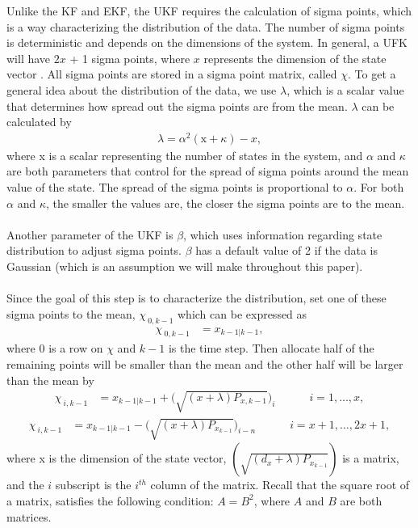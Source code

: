 \begin{enumerate}
\noindent Unlike the KF and EKF, the UKF requires the calculation of sigma points, which is a way characterizing the distribution of the data. The number of sigma points is deterministic and depends on the dimensions of the system. In general, a UFK will have  $2x$ + 1 sigma points, where $x$ represents the dimension of the state vector \cite{inbook, inproceedings, Wan01theunscented}.  All sigma points are stored in a sigma point matrix, called $\chi$. To get a general idea about the distribution of the data, we use $\lambda$, which is a scalar value that determines how spread out the sigma points are from the mean. $\lambda$ can be calculated by
         \begin{align*}
        \lambda = \alpha^{2}(\text{x}+\kappa)-x,
         \end{align*}
         where x is a scalar representing the number of states in the system, and $\alpha$ and $\kappa$ are both parameters that control for the spread of sigma points around the mean value of the state. The spread of the sigma points is proportional to $\alpha$. For both $\alpha$ and $\kappa $,  the smaller the values are, the closer the sigma points are to the mean.\\ \\
       Another parameter of the UKF is $\beta$, which uses information regarding state distribution to adjust sigma points. $\beta$ has a default value of 2 if the data is Gaussian (which is an assumption we will make throughout this paper).  \\ \\
       Since the goal of this step is to characterize the distribution, set one of these sigma points to the mean, $\chi_{\ 0,k-1}$ which can be expressed as 
    \begin{align*}
        \chi_{\ 0,k-1} &= x_{k-1|k-1} ,
     \end{align*}
     where 0 is a row on $\chi$ and $k-1$ is the time step. Then allocate half of the remaining points will be smaller than the mean and the other half will be larger than the mean by
         \begin{align*}
        \chi_{\ i,k-1} &= x_{k-1|k-1} +  \bigg(\sqrt{(x+\lambda )P_{x,{k-1}}}\bigg)_{i} \quad \quad \quad i=1,\dots, x, 
        \end{align*}
         \begin{align*}
        \chi_{\ i,k-1} &= x_{k-1|k-1} - \bigg(\sqrt{(x+\lambda )P_{x_{k-1}}}\bigg)_{i-n} \quad \quad \quad i=x + 1,\dots,2x + 1,
        \end{align*}
        where x is the dimension of the state vector, $(\sqrt{(d_{x}+\lambda)P_{x_{k-1}}})$ is a matrix, and the $i$ subscript is the $i^{th}$ column of the matrix. 
        Recall that the square root of a matrix, satisfies the following condition: $A = B^2$, where $A$ and $B$ are both matrices. 
        

\end{enumerate}
